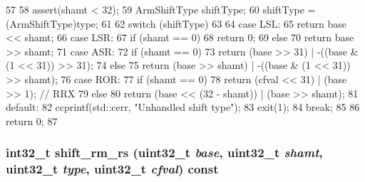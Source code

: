 \begin{DoxyCode}
57 {
58     assert(shamt < 32);
59     ArmShiftType shiftType;
60     shiftType = (ArmShiftType)type;
61 
62     switch (shiftType)
63     {
64       case LSL:
65         return base << shamt;
66       case LSR:
67         if (shamt == 0)
68             return 0;
69         else
70             return base >> shamt;
71       case ASR:
72         if (shamt == 0)
73             return (base >> 31) | -((base & (1 << 31)) >> 31);
74         else
75             return (base >> shamt) | -((base & (1 << 31)) >> shamt);
76       case ROR:
77         if (shamt == 0)
78             return (cfval << 31) | (base >> 1); // RRX
79         else
80             return (base << (32 - shamt)) | (base >> shamt);
81       default:
82         ccprintf(std::cerr, "Unhandled shift type\n");
83         exit(1);
84         break;
85     }
86     return 0;
87 }
\end{DoxyCode}
\hypertarget{classArmISA_1_1ArmStaticInst_a9c90a343b88f159bcb263bd2457848a5}{
\subsubsection[{shift\_\-rm\_\-rs}]{\setlength{\rightskip}{0pt plus 5cm}int32\_\-t shift\_\-rm\_\-rs ({\bf uint32\_\-t} {\em base}, \/  {\bf uint32\_\-t} {\em shamt}, \/  {\bf uint32\_\-t} {\em type}, \/  {\bf uint32\_\-t} {\em cfval}) const}}
\label{classArmISA_1_1ArmStaticInst_a9c90a343b88f159bcb263bd2457848a5}



